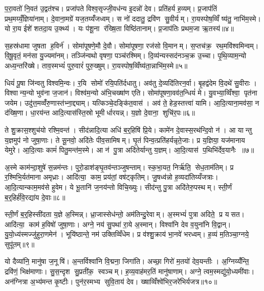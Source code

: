 प॒रा॒वतो॑ नि॒वत॑ उ॒द्वत॑श्च। प्रजा॑पते विश्व॒सृज्जी॒वध॑न्य इ॒दन्नो॑ देव। प्रति॑हर्य ह॒व्यम्। प्र॒जाप॑तिं प्रथ॒मय्यँ॒ज्ञिया॑नाम्। दे॒वाना॒मग्रे॑ यज॒तय्यँ॑जध्वम्। स नो॑ ददातु॒ द्रवि॑ण सु॒वीर्यम्। रा॒यस्पोष॒व्विँ ष्य॑तु॒ नाभि॑म॒स्मे। यो रा॒य ईशे॑ शतदा॒य उ॒क्थ्य॑। यः प॑शू॒ना र॑ख्षि॒ता विष्ठि॑तानाम्। प्र॒जाप॑तिः प्रथम॒जा ऋ॒तस्य॑॥४॥

स॒हस्र॑धामा जुषता ह॒विर्न॑। सोमा॑पूषणे॒मौ दे॒वौ। सोमा॑पूषणा॒ रज॑सो वि॒मानम्। स॒प्तच॑क्र॒ रथ॒मवि॑श्वमिन्वम्। वि॒षू॒वृतं॒ मन॑सा यु॒ज्यमा॑नम्। तञ्जि॑न्वथो वृषणा॒ पञ्च॑रश्मिम्। दि॒व्य॑न्यस्सद॑नञ्च॒क्र उ॒च्चा। पृ॒थि॒व्याम॒न्यो अध्य॒न्तरि॑ख्षे। ताव॒स्मभ्यं॑ पुरु॒वारं॑ पुरु॒ख्षुम्। रा॒यस्पोष॒व्विँष्य॑ता॒न्नाभि॑म॒स्मे॥५॥

धियं॑ पू॒षा जि॑न्वतु विश्वमि॒न्वः। र॒यि सोमो॑ रयि॒पति॑र्दधातु। अव॑तु दे॒व्यदि॑तिरन॒र्वा। बृ॒हद्व॑देम वि॒दथे॑ सु॒वीराः। विश्वान्य॒न्यो भुव॑ना ज॒जान॑। विश्व॑म॒न्यो अ॑भि॒चख्षा॑ण एति। सोमा॑पूषणा॒वव॑त॒न्धियं॑ मे। यु॒वभ्या॒व्विँश्वा॒ पृत॑ना जयेम। उदु॑त्त॒मव्वँ॑रु॒णास्त॑भ्ना॒द्द्याम्। यत्किञ्चे॒दङ्कि॑त॒वास॑। अव॑ ते॒ हेड॒स्तत्त्वा॑ यामि। आ॒दि॒त्याना॒मव॑सा॒ न द॑ख्षि॒णा। धा॒रय॑न्त आदि॒त्यास॑स्ति॒स्रो भूमीर्धारयन्न्। य॒ज्ञो दे॒वाना॒ शुचि॑र॒पः॥६॥\anuvakamend[म॒नी॒षाऽस्तु॑ च॒र्तस्या॒स्मे कि॑त॒वास॑श्च॒त्वारि॑ च]

ते शु॒क्रास॒श्शुच॑यो रश्मि॒वन्त॑। सीद॑न्नादि॒त्या अधि॑ ब॒र्॒हिषि॑ प्रि॒ये। कामे॑न दे॒वास्स॒रथ॑न्दि॒वो न॑। आ यान्तु य॒ज्ञमुप॑ नो जुषा॒णाः। ते सू॒नवो॒ अदि॑तेः पीव॒सामिषम्। घृ॒तं पिन्व॒त्प्रति॑हर्यन्नृते॒जाः। प्र य॒ज्ञिया॒ यज॑मानाय येमुरे। आ॒दि॒त्याः कामं॑ पितु॒मन्त॑म॒स्मे। आ न॑ पु॒त्रा अदि॑तेर्यान्तु य॒ज्ञम्। आ॒दि॒त्यास॑ प॒थिभि॑र्देव॒यानैः ॥७॥

अ॒स्मे काम॑न्दा॒शुषे॑ स॒न्नम॑न्तः। पुरो॒डाश॑ङ्घृ॒तव॑न्तञ्जुषन्ताम्। स्क॒भा॒यत॒ निर्\mbox{}ऋ॑ति॒ सेध॒ताम॑तिम्। प्र र॒श्मिभि॒र्यत॑माना अमृध्राः। आदि॑त्या॒ काम॒ प्रय॑तां॒ वष॑ट्कृतिम्। जु॒षध्व॑न्नो ह॒व्यदा॑तिय्यँजत्राः। आ॒दि॒त्यान्काम॒मव॑से हुवेम। ये भू॒तानि॑ ज॒नय॑न्तो विचि॒ख्युः। सीद॑न्तु पु॒त्रा अदि॑तेरु॒पस्थम्। स्ती॒र्णं ब॒र्॒हिर्\mbox{}ह॑वि॒रद्या॑य दे॒वाः॥८॥

स्ती॒र्णं ब॒र्॒हिस्सी॑दता य॒ज्ञे अ॒स्मिन्न्। ध्रा॒जास्सेध॑न्तो॒ अम॑तिन्दु॒रेवाम्। अ॒स्मभ्यं॑ पुत्रा अदिते॒ प्र यसत। आदि॑त्या॒ काम॑ ह॒विषो॑ जुषा॒णाः। अग्ने॒ नय॑ सु॒पथा॑ रा॒ये अ॒स्मान्। विश्वा॑नि देव व॒युना॑नि वि॒द्वान्। यु॒यो॒ध्य॑स्मज्जु॑हुरा॒णमेन॑। भूयि॑ष्ठान्ते॒ नम॑ उक्तिव्विँधेम। प्र व॑श्शु॒क्राय॑ भा॒नवे॑ भरध्वम्। ह॒व्यं म॒तिञ्चा॒ग्नये॒ सुपू॑तम्॥९॥

यो दैव्या॑नि॒ मानु॑षा ज॒नूषि॑। अ॒न्तर्विश्वा॑नि वि॒द्मना॒ जिगा॑ति। अच्छा॒ गिरो॑ म॒तयो॑ देव॒यन्तीः। अ॒ग्निय्यँ॑न्ति॒ द्रवि॑णं॒ भिक्ष॑माणाः। सु॒स॒न्दृश सु॒प्रती॑क॒ स्वञ्चम्। ह॒व्य॒वाह॑मर॒तिं मानु॑षाणाम्। अग्ने॒ त्वम॒स्मद्यु॑यो॒ध्यमी॑वाः। अन॑ग्नित्रा अ॒भ्य॑मन्त कृ॒ष्टीः। पुन॑र॒स्मभ्य सुवि॒ताय॑ देव। ख्षाव्विँश्वे॑भिर॒जरे॑भिर्यजत्र॥१०॥

